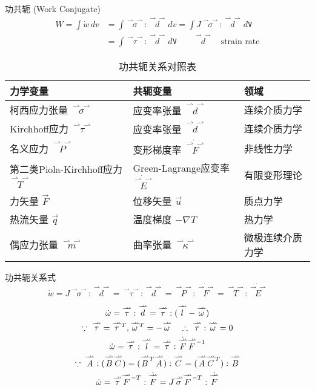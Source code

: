 \documentclass[12pt, a4paper, oneside, UTF8]{ctexbook}  %
\newcommand{\vvec}{\overset{\rightharpoonup\!\!\!\! \rightharpoonup}}
\newcommand{\lmT}{\raisebox{-0.85ex}{$\scriptstyle -T$}} %
\newcommand{\lmone}{\raisebox{-0.85ex}{$\scriptstyle -1$}} %
\newcommand{\lsup}[1]{\raisebox{-0.85ex}{$\scriptstyle #1$}}
\begin{document}
\begin{defn}
	功共轭 (Work Conjugate)
	\begin{align*}
		\dot{W}=\int \dot{w}\,dv&=\int \vvec{\sigma}:\vvec{d}\,dv
		=\int J\vvec{\sigma}:\vvec{d}\,d\mathtt{V}\\
		&=\int \vvec{\tau}:\vvec{d}\,d\mathtt{V}\quad\quad\vvec{d}\quad\text{strain rate}
	\end{align*}
	\begin{table}[ht]
		\centering
		\caption{功共轭关系对照表}
		\label{tab:work_conjugate}
		\begin{tabular}{lll}
		\toprule
		\textbf{力学变量} & \textbf{共轭变量} & \textbf{领域} \\
		\midrule
		柯西应力张量 $\vvec{\sigma}$ & 应变率张量 $\vvec{d}$ & 连续介质力学 \\
		Kirchhoff应力 $\vvec{\tau}$ & 应变率张量 $\vvec{d}$ & 连续介质力学 \\
		名义应力 $\vvec{P}$ & 变形梯度率 $\dot{\vvec{F}}$ & 非线性力学 \\
		第二类Piola-Kirchhoff应力 $\vvec{T}$ & Green-Lagrange应变率 $\dot{\vvec{E}}$ & 有限变形理论 \\
		力矢量 $\vec{F}$ & 位移矢量 $\vec{u}$ & 质点力学 \\
		热流矢量 $\vec{q}$ & 温度梯度 $-\nabla T$ & 热力学 \\
		偶应力张量 $\vvec{m}$ & 曲率张量 $\vvec{\kappa}$ & 微极连续介质力学 \\
		\bottomrule
		\end{tabular}
		\end{table}
		\begin{center}
			功共轭关系式
		\[\boxed{\dot{w}=J\vvec{\sigma}:\vvec{d}=\vvec{\tau}:\vvec{d}
		=\vvec{P}:\dot{\vvec{F}}=\vvec{T}:\dot{\vvec{E}}}\]
		\end{center}
	\begin{gather*}
		\dot{\omega}=\vvec{\tau}:\vvec{d}=\vvec{\tau}:(\vvec{l}-\vvec{\omega})\\
		\because\;\vvec{\tau}=\vvec{\tau}^{\lsup{T}},\vvec{\omega}^{\lsup{T}}=-\vvec{\omega}\quad
		\therefore\;\vvec{\tau}:\vvec{\omega}=0\\
		\dot{\omega}=\vvec{\tau}:\vvec{l}=\vvec{\tau}:\dot{\vvec{F}}\vvec{F}^{\lmone}\\
		\because\;\vvec{A}:(\vvec{B}\vvec{C})=(\vvec{B}^{\lsup{T}}\vvec{A}):\vvec{C}
		=(\vvec{A}\vvec{C}^{\lsup{T}}):\vvec{B}\\
		\dot{\omega}=\vvec{\tau}\vvec{F}^{\lmT}:\dot{\vvec{F}}=J\vvec{\sigma}\vvec{F}^{\lmT}:\dot{\vvec{F}}

\end{gather*}
\end{defn}
\end{document}
